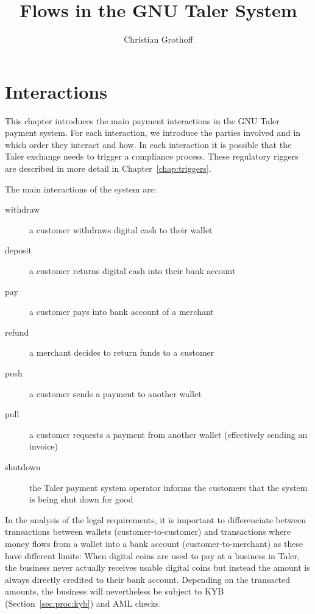 \documentclass[10pt,a4paper,oneside]{book}
\author{Christian Grothoff}
\title{Flows in the GNU Taler System}
\begin{document}
\maketitle
\tableofcontents

\chapter{Interactions} \label{chap:interactions}

This chapter introduces the main payment interactions in the GNU Taler payment
system. For each interaction, we introduce the parties involved and in which
order they interact and how.  In each interaction it is possible that the
Taler exchange needs to trigger a compliance process.  These regulatory
riggers are described in more detail in Chapter~\ref{chap:triggers}.

The main interactions of the system are:

\begin{description}
  \item[withdraw] a customer withdraws digital cash to their wallet
  \item[deposit] a customer returns digital cash into their bank account
  \item[pay] a customer pays into bank account of a merchant
  \item[refund] a merchant decides to return funds to a customer
  \item[push] a customer sends a payment to another wallet
  \item[pull] a customer requests a payment from another wallet (effectively sending an invoice)
  \item[shutdown] the Taler payment system operator informs the customers that the system is being shut down for good
\end{description}

In the analysis of the legal requirements, it is important to differenciate
between transactions between wallets (customer-to-customer) and transactions
where money flows from a wallet into a bank account (customer-to-merchant) as
these have different limits: When digital coins are used to pay at a business in
Taler, the business never actually receives usable digital coins but instead
the amount is always directly credited to their bank account.  Depending on
the transacted amounts, the business will nevertheless be subject to KYB
(Section~\ref{sec:proc:kyb}) and AML checks.
\end{document}
